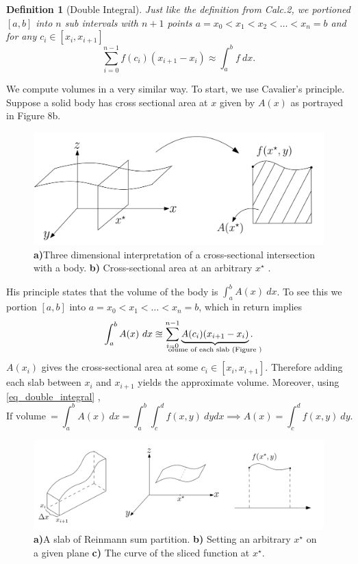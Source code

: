 \documentclass[
	12pt,
	]{article}
\theoremstyle{custom}
\theoremstyle{custom}
\theoremstyle{custom}
\theoremstyle{custom}
\newtheorem{definition}{Definition}[section]
\theoremstyle{custom}
\theoremstyle{definition}
\theoremstyle{example}
\theoremstyle{note}
\theoremstyle{remark}
\theoremstyle{example}
\newcounter{theo}[section]\setcounter{theo}{0}
\numberwithin{equation}{subsection}
\begin{document}
	   		 \begin{definition}[Double Integral]
	   		 	Just like the definition from Calc.2, we portioned $[a,b]$ into $n$ sub intervals with $n+1$ points $a=x_{0} < x_{1} < x_{2} < \dots <x_{n} =b$ and for any $c_{i} \in [x_{i} , x_{i+1}]$
	   		 	$$ \sum_{i=0}^{n-1} f(c_{i})(x_{i+1}-x_{i}) \approx \int_{a}^{b} f \ dx.$$
	   		 \end{definition}
	   		 
	   		 \noindent We compute volumes in a very similar way. To start, we use Cavalier's principle. Suppose a solid body has cross sectional area at $x$ given by $A(x)$ as portrayed in Figure 8b.
	   		 \begin{figure}[H]
	   		 	   		 	\centering
	   		 	   		 	\includegraphics[width=0.8\linewidth]{MATH314_Notes_Fig5.png}
	   		 	   		 	\captionsetup{margin=1cm, justification=raggedright}\caption{\textbf{a)}Three dimensional interpretation of a cross-sectional intersection with a body. \textbf{b)} Cross-sectional area at an arbitrary $x^{\star}$ .}
	   		 	   		 \end{figure}
	   		 His principle states that the volume of the body is $\int_{a}^{b} A(x) \  dx$. To see this we portion $[a,b]$ into $a=x_{0} < x_{1} < \dots < x_{n} =b$, which in return implies 
	   		 $$ \int_{a}^{b} A(x) \  dx \approxeq \sum_{i=0}^{n-1}\underbrace{A(c_{i})(x_{i+1}- x_{i})}_{\mathclap{\text{olume of each slab (Figure )}}}.$$
	   		 $A(x_{i})$ gives the cross-sectional area at some $c_{i} \in [x_{i} , x_{i+1}]$. Therefore adding each slab between $x_{i}$ and $x_{i+1}$ yields the approximate volume. Moreover, using \eqref{eq_double_integral} ,
	   		 $$ \text{If volume} \ = \int_{a}^{b}A(x) \ dx = \int_{a}^{b}\int_{c}^{d} f(x,y) \ dydx \implies A(x) =\int_{c}^{d} f(x,y) \ dy. $$
	   		 \begin{figure}[H]
	   		 	\centering
	   		 	\includegraphics[width=\linewidth]{MATH314_Notes_Fig4.png}
	   		 	\captionsetup{margin=1cm, justification=raggedright}\caption{\textbf{a)}A slab of Reinmann sum partition. \textbf{b)} Setting an arbitrary $x^{\star}$ on a given plane \textbf{c)} The curve of the sliced function at $x^{\star}$.}
	   		 \end{figure}
\end{document}
